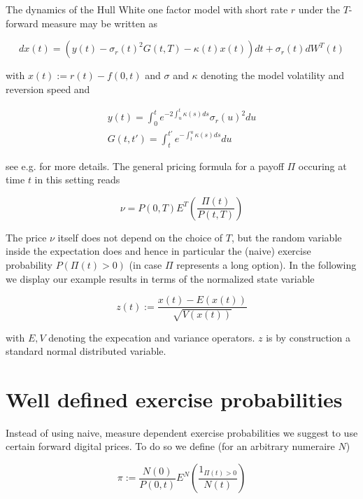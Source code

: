 \documentclass{amsart}
\theoremstyle{plain}
\numberwithin{equation}{section}
\begin{document}
The dynamics of the Hull White one factor model with short rate $r$ under the $T$-forward measure may be written as 

\begin{equation}\label{hwdyn}
dx(t) = (y(t)-\sigma_r(t)^2G(t,T)-\kappa(t)x(t))dt+\sigma_r(t)dW^T(t)
\end{equation}

with $x(t) := r(t) - f(0,t)$ and $\sigma$ and $\kappa$ denoting the model volatility and reversion speed and

\begin{eqnarray}
y(t) = \int_0^t e^{-2 \int_u^t \kappa(s) ds} \sigma_r(u)^2 du \\
G(t,t') = \int_t^{t'} e^{-\int_t^u\kappa(s)ds} du
\end{eqnarray}

see e.g. \cite{piterbarg} for more details. The general pricing formula for a payoff $\Pi$ occuring at time $t$ in this setting reads

\begin{equation}
\nu = P(0,T) E^T \left( \frac{\Pi(t)}{P(t,T)} \right)
\end{equation}

The price $\nu$ itself does not depend on the choice of $T$, but the random variable inside the expectation does and hence 
in particular the (naive) exercise probability $P(\Pi(t) > 0 )$ (in case $\Pi$ represents a long option). In the following we display our example results in terms of the normalized state
variable

\begin{equation}
z(t) := \frac{x(t) - E(x(t))}{\sqrt{V(x(t))}}
\end{equation}

with $E, V$ denoting the expecation and variance operators. $z$ is by construction a standard normal distributed variable.

\section{Well defined exercise probabilities}

Instead of using naive, measure dependent exercise probabilities we suggest to use certain forward digital prices. To do so we define (for an arbitrary numeraire $N$)

\begin{equation}\label{defpi}
\pi := \frac{N(0)}{P(0,t)} E^N \left( \frac{1_{\Pi(t)>0}}{N(t)} \right)
\end{equation}
\end{document}
